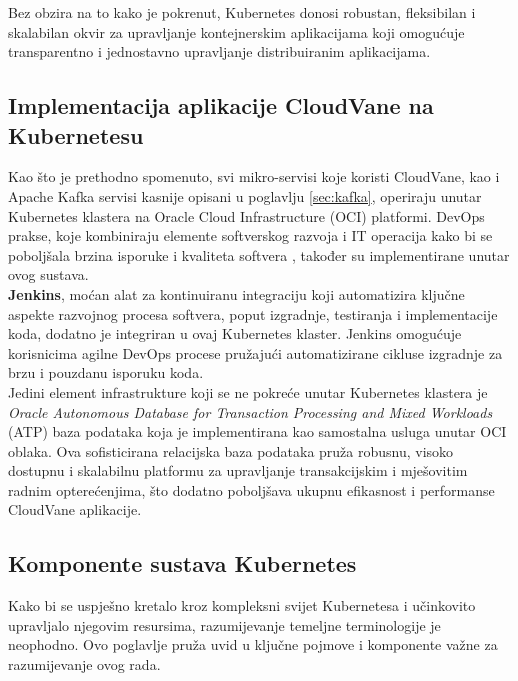 \documentclass[times, utf8, diplomski]{fer}
\begin{document}
Bez obzira na to kako je pokrenut, Kubernetes donosi robustan, fleksibilan i skalabilan okvir za upravljanje kontejnerskim aplikacijama koji omogućuje transparentno i jednostavno upravljanje distribuiranim aplikacijama.

\subsection{Implementacija aplikacije CloudVane na Kubernetesu}

Kao što je prethodno spomenuto, svi mikro-servisi koje koristi CloudVane, kao i Apache Kafka servisi kasnije opisani u poglavlju \ref{sec:kafka}, operiraju unutar Kubernetes klastera na Oracle Cloud Infrastructure (OCI) platformi. DevOps prakse, koje kombiniraju elemente softverskog razvoja  i IT operacija  kako bi se poboljšala brzina isporuke i kvaliteta softvera \citep{courtemanche_what_nodate}, također su implementirane unutar ovog sustava.\\

\textbf{Jenkins}, moćan alat za kontinuiranu integraciju koji automatizira ključne aspekte razvojnog procesa softvera, poput izgradnje, testiranja i implementacije koda, dodatno je integriran u ovaj Kubernetes klaster. Jenkins omogućuje korisnicima agilne DevOps procese pružajući automatizirane cikluse izgradnje za brzu i pouzdanu isporuku koda.\\

Jedini element infrastrukture koji se ne pokreće unutar Kubernetes klastera je \emph{Oracle Autonomous Database for Transaction Processing and Mixed Workloads} (ATP) baza podataka koja je implementirana kao samostalna usluga unutar OCI oblaka. Ova sofisticirana relacijska baza podataka pruža robusnu, visoko dostupnu i skalabilnu platformu za upravljanje transakcijskim i mješovitim radnim opterećenjima, što dodatno poboljšava ukupnu efikasnost i performanse CloudVane aplikacije.\\

\subsection{Komponente sustava Kubernetes}
\label{sec:k8sComponents}

Kako bi se uspješno kretalo kroz kompleksni svijet Kubernetesa i učinkovito upravljalo njegovim resursima, razumijevanje temeljne terminologije je neophodno. Ovo poglavlje pruža uvid u ključne pojmove i komponente važne za razumijevanje ovog rada.
\end{document}
